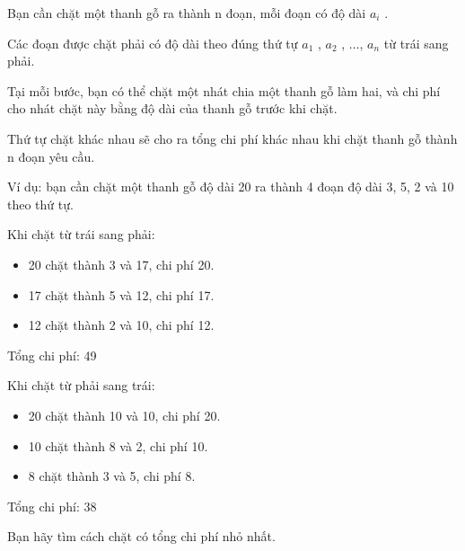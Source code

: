 Bạn cần chặt một thanh gỗ ra thành n đoạn, mỗi đoạn có độ dài $a_{i}$ .

Các đoạn được chặt phải có độ dài theo đúng thứ tự $a_{1}$ , $a_{2}$ , ..., $a_{n}$ từ trái sang phải.

Tại mỗi bước, bạn có thể chặt một nhát chia một thanh gỗ làm hai, và chi phí cho nhát chặt này bằng độ dài của thanh gỗ trước khi chặt.

Thứ tự chặt khác nhau sẽ cho ra tổng chi phí khác nhau khi chặt thanh gỗ thành n đoạn yêu cầu.

Ví dụ: bạn cần chặt một thanh gỗ độ dài 20 ra thành 4 đoạn độ dài 3, 5, 2 và 10 theo thứ tự.

Khi chặt từ trái sang phải:
\begin{itemize}
	\item 20 chặt thành 3 và 17, chi phí 20.
	\item 17 chặt thành 5 và 12, chi phí 17.
	\item 12 chặt thành 2 và 10, chi phí 12.
\end{itemize}

Tổng chi phí: 49

Khi chặt từ phải sang trái:
\begin{itemize}
	\item 20 chặt thành 10 và 10, chi phí 20.
	\item 10 chặt thành 8 và 2, chi phí 10.
	\item 8 chặt thành 3 và 5, chi phí 8.
\end{itemize}

Tổng chi phí: 38

Bạn hãy tìm cách chặt có tổng chi phí nhỏ nhất.